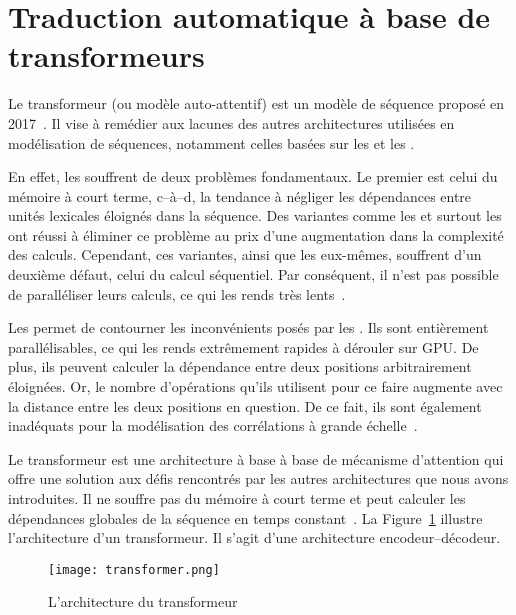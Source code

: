 \section{Traduction automatique à base de transformeurs}
\label{sec:nmt-attention}

Le transformeur (ou modèle auto-attentif) est un modèle de séquence proposé en 2017~\cite{attention}.
Il vise à remédier aux lacunes des autres architectures utilisées en modélisation de séquences, 
notamment celles basées sur les  et les .

En effet, les  souffrent de deux problèmes fondamentaux. 
Le premier est celui du mémoire à court terme, 
c--à--d, la tendance à négliger les dépendances entre unités lexicales éloignés dans la séquence.
Des variantes comme les  et surtout les  
ont réussi à éliminer ce problème au prix d'une augmentation dans la complexité des calculs.
Cependant, ces variantes, ainsi que les  eux-mêmes, souffrent d'un deuxième défaut,
celui du calcul séquentiel.
Par conséquent, il n'est pas possible de paralléliser leurs calculs, 
ce qui les rends très lents~\cite{attention,deep-nmt-survey}.

Les  permet de contourner les inconvénients posés par les .
Ils sont entièrement parallélisables, ce qui les rends extrêmement rapides à dérouler sur GPU.
De plus, ils peuvent calculer la dépendance entre deux positions arbitrairement éloignées.
Or, le nombre d'opérations qu'ils utilisent pour ce faire 
augmente avec la distance entre les deux positions en question.
De ce fait, ils sont également inadéquats pour la modélisation des corrélations à grande échelle~\cite{deep-nmt-survey}.

Le transformeur est une architecture à base à base de mécanisme d'attention 
qui offre une solution aux défis rencontrés par les autres architectures que nous avons introduites.
Il ne souffre pas du mémoire à court terme 
et peut calculer les dépendances globales de la séquence en temps constant~\cite{attention}.
La Figure~\ref{fig:transformer} illustre l'architecture d'un transformeur.
Il s'agit d'une architecture encodeur--décodeur.

\begin{figure}
    \begin{center}
        \texttt{[image: transformer.png]}
    \end{center}
    \caption[L'architecture du transformeur]
    {L'architecture du transformeur~\cite[Fig 1]{attention}}
    \label{fig:transformer}
\end{figure}

